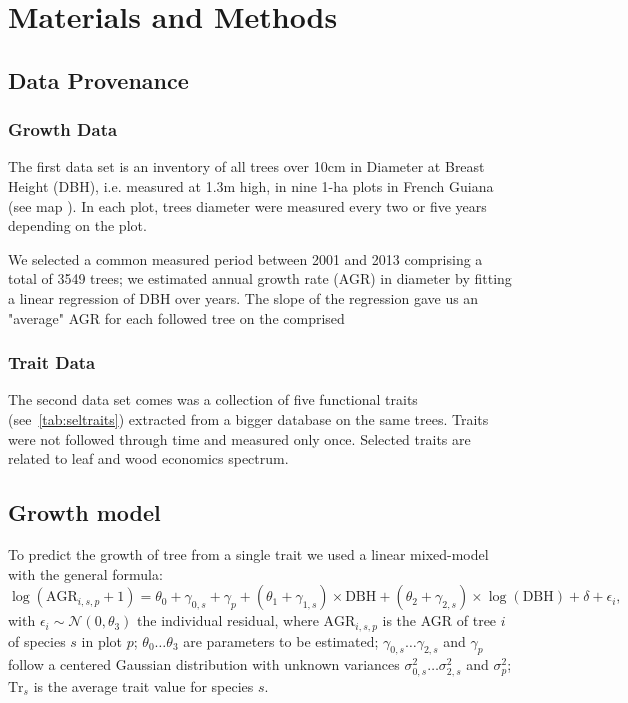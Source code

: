 \section*{Materials and Methods}
\label{sec:M&M}

\subsection*{Data Provenance}

\subsubsection*{Growth Data}
The first data set is an inventory of all trees over 10cm in Diameter at Breast Height (DBH), i.e. measured at 1.3m high, in nine 1-ha plots in French Guiana (see map \missfig). In each plot, trees diameter were measured every two or five years depending on the plot.

We selected a common measured period between 2001 and 2013 comprising a total of 3549 trees; we estimated annual growth rate (AGR) in diameter by fitting a linear regression of DBH over years. The slope of the regression gave us an "average" AGR for each followed tree on the comprised 


\subsubsection*{Trait Data}

The second data set comes was a collection of five functional traits (see~\autoref{tab:seltraits}) extracted from a bigger database \citep{baraloto_functional_2010, baraloto_decoupled_2010} on the same trees. Traits were not followed through time and measured only once. Selected traits are related to leaf and wood economics spectrum.


\subsection*{Growth model}

To predict the growth of tree from a single trait we used a linear mixed-model with the general formula:
\begin{equation}
	\label{eq:growth_mod}
	\log(\text{AGR}_{i, s, p} + 1) = \theta_0 + \gamma_{0, s} + \gamma_p
		+ (\theta_1 + \gamma_{1, s}) \times \text{DBH}
		+ (\theta_2 + \gamma_{2, s}) \times \log(\text{DBH})
		+ \delta
		+ \epsilon_i,
\end{equation}
with $\epsilon_i \sim \mathcal{N}(0, \theta_3)$ the individual residual,
where $\text{AGR}_{i, s, p}$ is the AGR of tree $i$ of species $s$ in plot $p$; $\theta_0 \ldots \theta_3$ are parameters to be estimated; $\gamma_{0, s} \ldots \gamma_{2, s}$ and $\gamma_p$ follow a centered Gaussian distribution with unknown variances $\sigma^2_{0, s} \ldots \sigma^2_{2, s}$ and $\sigma^2_p$; $\text{Tr}_s$ is the average trait value for species $s$.

